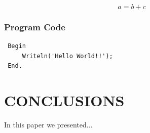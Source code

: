 \documentclass[a4paper,twoside]{article}
\begin{document}
\begin{equation}\label{eq1}
    a=b+c
\end{equation}

\subsubsection{Program Code}\label{subsubsec:program_code}


\begin{small}
\begin{verbatim}
 Begin
     Writeln('Hello World!!');
 End.
\end{verbatim}
\end{small}


\cite{DuchiJordan:2014:PrivacyAwareLearning}
\cite{iMLExperiment}


\section{\uppercase{Conclusions}}
\label{sec:conclusion}

\noindent In this paper we presented...




\vfill

{\small
}




\vfill
\end{document}
